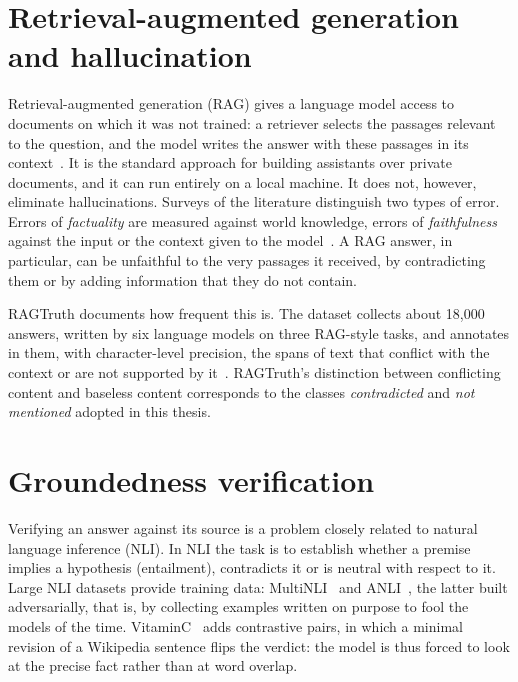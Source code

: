 \section{Retrieval-augmented generation and hallucination}
\label{sec:bg-rag}

Retrieval-augmented generation (RAG) gives a language model access to documents on which it was not trained: a
retriever selects the passages relevant to the question, and the model writes the answer with these passages in its
context~\cite{lewis2020rag}. It is the standard approach for building assistants over private documents, and it can run
entirely on a local machine. It does not, however, eliminate hallucinations. Surveys of the literature distinguish two
types of error. Errors of \emph{factuality} are measured against world knowledge, errors of \emph{faithfulness} against
the input or the context given to the model~\cite{huang2025hallucination}. A RAG answer, in particular, can be
unfaithful to the very passages it received, by contradicting them or by adding information that they do not contain.

RAGTruth documents how frequent this is. The dataset collects about 18{,}000 answers, written by six language models on
three RAG-style tasks, and annotates in them, with character-level precision, the spans of text that conflict with the
context or are not supported by it~\cite{niu2024ragtruth}. RAGTruth's distinction between conflicting content and
baseless content corresponds to the classes \emph{contradicted} and \emph{not mentioned} adopted in this thesis.

\section{Groundedness verification}
\label{sec:bg-verification}

Verifying an answer against its source is a problem closely related to natural language inference (NLI). In NLI the
task is to establish whether a premise implies a hypothesis (entailment), contradicts it or is neutral with respect to
it. Large NLI datasets provide training data: MultiNLI~\cite{williams2018mnli} and ANLI~\cite{nie2020anli}, the latter
built adversarially, that is, by collecting examples written on purpose to fool the models of the time.
VitaminC~\cite{schuster2021vitaminc} adds contrastive pairs, in which a minimal revision of a Wikipedia sentence flips
the verdict: the model is thus forced to look at the precise fact rather than at word overlap.

